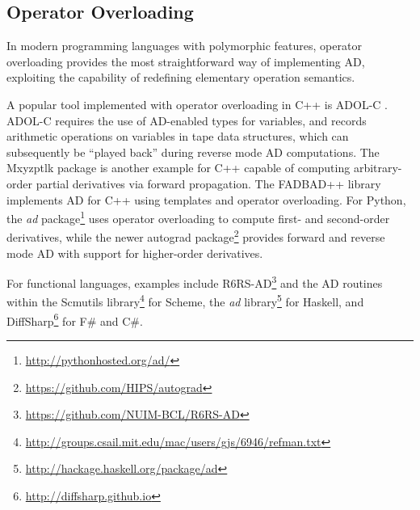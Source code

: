 \documentclass[twoside,11pt]{article}
\begin{document}
\subsection{Operator Overloading}

In modern programming languages with polymorphic features, operator overloading provides the most straightforward way of implementing AD, exploiting the capability of redefining elementary operation semantics.

A popular tool implemented with operator overloading in C++ is ADOL-C \citep{Walther2012}. ADOL-C requires the use of AD-enabled types for variables, and records arithmetic operations on variables in tape data structures, which can subsequently be ``played back'' during reverse mode AD computations. The Mxyzptlk package \citep{Michelotti1990} is another example for C++ capable of computing arbitrary-order partial derivatives via forward propagation. The FADBAD++ library \citep{Bendtsen1996} implements AD for C++ using templates and operator overloading. For Python, the \emph{ad} package\footnote{\url{http://pythonhosted.org/ad/}} uses operator overloading to compute first- and second-order derivatives, while the newer autograd package\footnote{\url{https://github.com/HIPS/autograd}} provides forward and reverse mode AD with support for higher-order derivatives.

For functional languages, examples include R6RS-AD\footnote{\url{https://github.com/NUIM-BCL/R6RS-AD}} and the AD routines within the Scmutils library\footnote{\url{http://groups.csail.mit.edu/mac/users/gjs/6946/refman.txt}} for Scheme, the \emph{ad} library\footnote{\url{http://hackage.haskell.org/package/ad}} for Haskell, and DiffSharp\footnote{\url{http://diffsharp.github.io}} for F\# and C\#.

\end{document}
